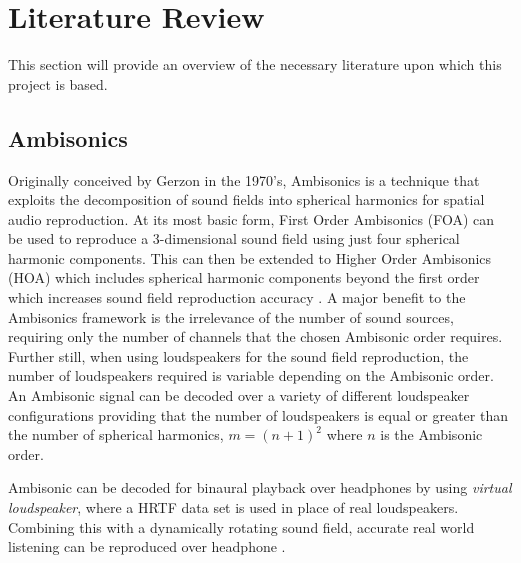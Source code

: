 
















\section{Literature Review} \label{lit}

	This section will provide an overview of the necessary literature upon which this project is based. \\

	\subsection{Ambisonics}

		Originally conceived by Gerzon \cite{gerzon1973} in the 1970's, Ambisonics is a technique that exploits the decomposition of sound fields into spherical harmonics for spatial audio reproduction. At its most basic form, First Order Ambisonics (FOA) can be used to reproduce a 3-dimensional sound field using just four spherical harmonic components. This can then be extended to Higher Order Ambisonics (HOA) which includes spherical harmonic components beyond the first order which increases sound field reproduction accuracy \cite{Bertet2007}. A major benefit to the Ambisonics framework is the irrelevance of the number of sound sources, requiring only the number of channels that the chosen Ambisonic order requires. Further still, when using loudspeakers for the sound field reproduction, the number of loudspeakers required is variable depending on the Ambisonic order. An Ambisonic signal can be decoded over a variety of different loudspeaker configurations providing that the number of loudspeakers is equal or greater than the number of spherical harmonics, $m =(n+1)^2$ where $n$ is the Ambisonic order.

		Ambisonic can be decoded for binaural playback over headphones by using \textit{virtual loudspeaker}, where a HRTF data set is used in place of real loudspeakers. Combining this with a dynamically rotating sound field, accurate real world listening can be reproduced over headphone \cite{Mckeag1996} \cite{Noisternig2003}.

